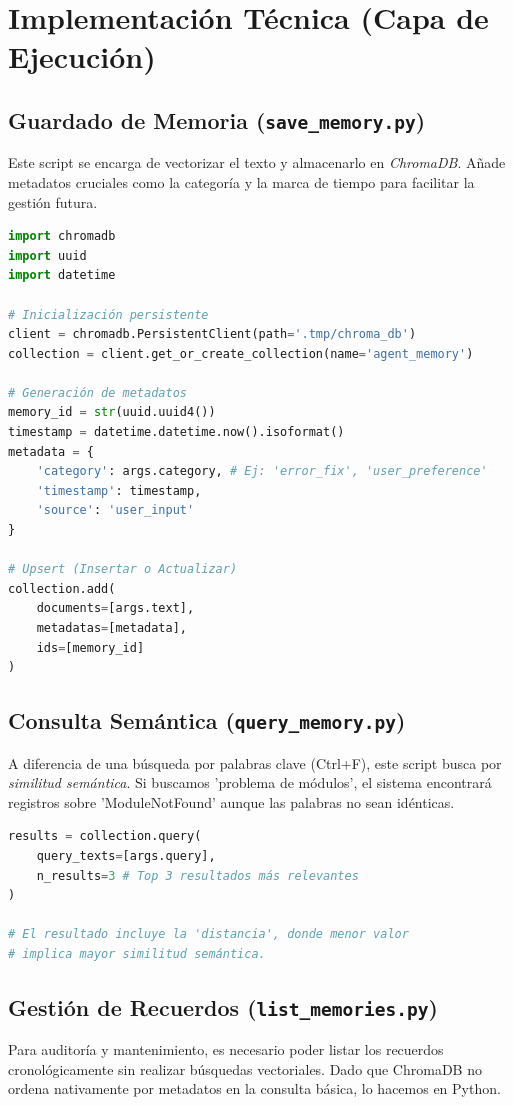 \documentclass[12pt, a4paper]{article}
\begin{document}
\section{Implementación Técnica (Capa de Ejecución)}

\subsection{Guardado de Memoria (\texttt{save\_memory.py})}
Este script se encarga de vectorizar el texto y almacenarlo en \textit{ChromaDB}. Añade metadatos cruciales como la categoría y la marca de tiempo para facilitar la gestión futura.

\begin{lstlisting}[language=Python, caption=Fragmento clave de save\_memory.py]
import chromadb
import uuid
import datetime

# Inicialización persistente
client = chromadb.PersistentClient(path='.tmp/chroma_db')
collection = client.get_or_create_collection(name='agent_memory')

# Generación de metadatos
memory_id = str(uuid.uuid4())
timestamp = datetime.datetime.now().isoformat()
metadata = {
    'category': args.category, # Ej: 'error_fix', 'user_preference'
    'timestamp': timestamp,
    'source': 'user_input'
}

# Upsert (Insertar o Actualizar)
collection.add(
    documents=[args.text],
    metadatas=[metadata],
    ids=[memory_id]
)
\end{lstlisting}

\subsection{Consulta Semántica (\texttt{query\_memory.py})}
A diferencia de una búsqueda por palabras clave (Ctrl+F), este script busca por \textit{similitud semántica}. Si buscamos 'problema de módulos', el sistema encontrará registros sobre 'ModuleNotFound' aunque las palabras no sean idénticas.

\begin{lstlisting}[language=Python, caption=Lógica de búsqueda semántica]
results = collection.query(
    query_texts=[args.query],
    n_results=3 # Top 3 resultados más relevantes
)

# El resultado incluye la 'distancia', donde menor valor 
# implica mayor similitud semántica.
\end{lstlisting}

\subsection{Gestión de Recuerdos (\texttt{list\_memories.py})}
Para auditoría y mantenimiento, es necesario poder listar los recuerdos cronológicamente sin realizar búsquedas vectoriales. Dado que ChromaDB no ordena nativamente por metadatos en la consulta básica, lo hacemos en Python.
\end{document}
